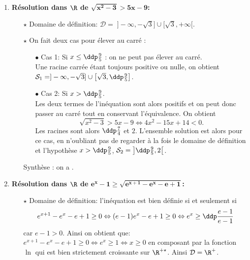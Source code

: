 \begin{correction}
\begin{enumerate}
\begin{itemize}
\begin{itemize}
\end{itemize} 
Synth\`ese : on a  .
\end{itemize} 
\item \textbf{R\'esolution dans $\mathbf{\R}$ de $\mathbf{\sqrt{x^2-3}>5x-9}$:}\\
\noindent \begin{itemize}
\item[$\star$] Domaine de d\'efinition: $\mathcal{D}= \; \rbrack -\infty, -\sqrt{3}\rbrack\cup\lbrack \sqrt{3},+\infty\lbrack$.
\item[$\star$]  On fait deux cas pour \'elever au carr\'e : 
 \begin{itemize}
 \item[$\bullet$]  Cas 1: Si $x\leq \ddp\frac{9}{5}$ : on ne peut pas \'elever au carr\'e.\\
\noindent Une racine carr\'ee \'etant toujours positive ou nulle, on obtient $\mathcal{S}_1=\rbrack -\infty, -\sqrt{3}\rbrack\cup\left\lbrack \sqrt{3},\ddp\frac{9}{5}\right\rbrack$.
 \item[$\bullet$]  Cas 2: Si $x > \ddp\frac{9}{5}$.\\
\noindent Les deux termes de l'in\'equation sont alors positifs et on peut donc passer au carr\'e tout en conservant l'\'equivalence. On obtient 
$$\sqrt{x^2-3}>5x-9 \Leftrightarrow 4x^2-15x+14<0.$$
Les racines sont alors $\ddp\frac{7}{4}$ et $2$. L'ensemble solution est alors pour ce cas, en n'oubliant pas de regarder \`a la fois le domaine de d\'efinition et l'hypoth\`ese $x > \ddp\frac{9}{5}$, $\mathcal{S}_2=\left\rbrack \ddp\frac{9}{5}, 2\right\lbrack$.
\end{itemize} 
Synth\`ese : on a  .
\end{itemize}  
\item \textbf{R\'esolution dans $\mathbf{\R}$ de $\mathbf{e^x-1\geq \sqrt{e^{x+1}-e^x-e+1}}$:}\\
\noindent 
\begin{itemize}
\item[$\star$] Domaine de d\'efinition: l'in\'equation est bien d\'efinie si et seulement si 
$$e^{x+1}-e^x-e+1 \geq 0\Leftrightarrow (e-1)e^x-e+1\geq 0\Leftrightarrow e^x\geq \ddp\frac{e-1}{e-1}$$ 
car $e-1>0$. Ainsi on obtient que: $e^{x+1}-e^x-e+1 \geq 0\Leftrightarrow e^x\geq 1\Leftrightarrow x\geq 0$ en composant par la fonction $\ln{}$ qui est bien strictement croissante sur $\R^{+\star}$. Ainsi $\mathcal{D}=\R^+$.

\end{itemize}
\end{enumerate}
\end{correction}
